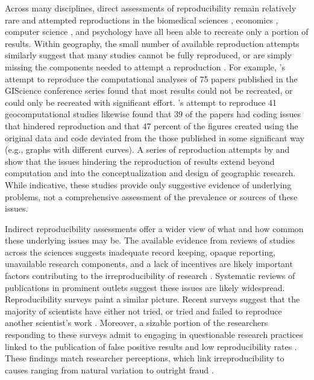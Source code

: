 Across many disciplines, direct assessments of reproducibility remain relatively rare and attempted reproductions in the biomedical sciences \citep{iqbal2016reproducible}, economics \citep{chang2015economics}, computer science \citep{moraila2014measuring}, and psychology \citep{open2015estimating} have all been able to recreate only a portion of results. 
Within geography, the small number of available reproduction attempts similarly suggest that many studies cannot be fully reproduced, or are simply missing the components needed to attempt a reproduction \citep{nust2018, Kedron2021ssrn, konkol2019, ostermann2021, Nust_AGILE_2022}.
For example, \citet{ostermann2021}'s attempt to reproduce the computational analyses of 75 papers published in the GIScience conference series found that most results could not be recreated, or could only be recreated with significant effort. 
\citet{konkol2019}'s attempt to reproduce 41 geocomputational studies likewise found that 39 of the papers had coding issues that hindered reproduction and that 47 percent of the figures created using the original data and code deviated from the those published in some significant way (e.g., graphs with different curves). 
A series of reproduction attempts by \citet{Kedron_MollaloRP, Kedron_SaffaryRP, Kedron_VijayanRP} and \citet{paez2022reproducibility} show that the issues hindering the reproduction of results extend beyond computation and into the conceptualization and design of geographic research.
While indicative, these studies provide only suggestive evidence of underlying problems, not a comprehensive assessment of the prevalence or sources of these issues.

Indirect reproducibility assessments offer a wider view of what and how common these underlying issues may be. 
The available evidence from reviews of studies across the sciences suggests inadequate record keeping, opaque reporting, unavailable research components, and a lack of incentives are likely important factors contributing to the irreproducibility of research \citep{NASEM2019}. 
Systematic reviews of publications in prominent outlets \citep{byrne_2017,stodden2018empirical} suggest these issues are likely widespread. 
Reproducibility surveys paint a similar picture. 
Recent surveys suggest that the majority of scientists have either not tried, or tried and failed to reproduce another scientist's work \citep{baker20161, boulbes2018survey}. 
Moreover, a sizable portion of the researchers responding to these surveys admit to engaging in questionable research practices linked to the publication of false positive results and low reproducibility rates \citep{fanelli2009many, fraser2018questionable}.
These findings match researcher perceptions, which link irreproducibility to causes ranging from natural variation to outright fraud \citep{ranstam2000fraud, anderson2007normative, baker20161}. 

